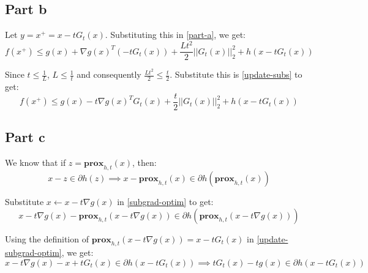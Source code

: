 \documentclass[11pt]{article}
\begin{document}
\subsection*{Part b}
\begin{flushleft}
Let \(y = x^{+} = x - tG_{t}(x)\). Substituting this in \ref{part-a}, we get:
\begin{equation}
\label{update-subs}
f(x^{+}) \leq g(x) + \nabla g(x)^{T}(-tG_{t}(x)) + \frac{Lt^{2}}{2}||G_{t}(x)||_{2}^{2} + h\left(x - tG_{t}(x)\right)
\end{equation}

Since \(t \leq \frac{1}{L}\), \(L \leq \frac{1}{t}\) and consequently \(\frac{Lt^2}{2} \leq \frac{t}{2}\). Substitute this is \ref{update-subs} to get:
\begin{equation}
\label{part-b}
f(x^{+}) \leq g(x) - t\nabla g(x)^TG_{t}(x) + \frac{t}{2}||G_{t}(x)||_{2}^{2} + h\left(x - tG_{t}(x)\right)
\end{equation}
\end{flushleft}

\subsection*{Part c}
\begin{flushleft}
We know that if \(z = \textbf{prox}_{h, t}(x)\), then:
\begin{equation}
\label{subgrad-optim}
x - z \in \partial h(z) \implies x - \textbf{prox}_{h, t}(x) \in \partial h(\textbf{prox}_{h, t}(x))
\end{equation}

Substitute \(x \leftarrow x - t\nabla g(x)\) in \ref{subgrad-optim} to get:
\begin{equation}
\label{update-subgrad-optim}
x - t\nabla g(x) - \textbf{prox}_{h, t}(x - t\nabla g(x)) \in \partial h(\textbf{prox}_{h, t}(x - t\nabla g(x)))
\end{equation}

Using the definition of \(\textbf{prox}_{h, t}(x - t\nabla g(x)) = x - tG_{t}(x)\) in \ref{update-subgrad-optim}, we get:
\begin{equation}
\label{part-c}
x - t\nabla g(x) - x + tG_{t}(x) \in \partial h(x - tG_{t}(x)) \implies tG_{t}(x) - tg(x) \in \partial h(x - tG_{t}(x))
\end{equation}
\end{flushleft}
\end{document}
